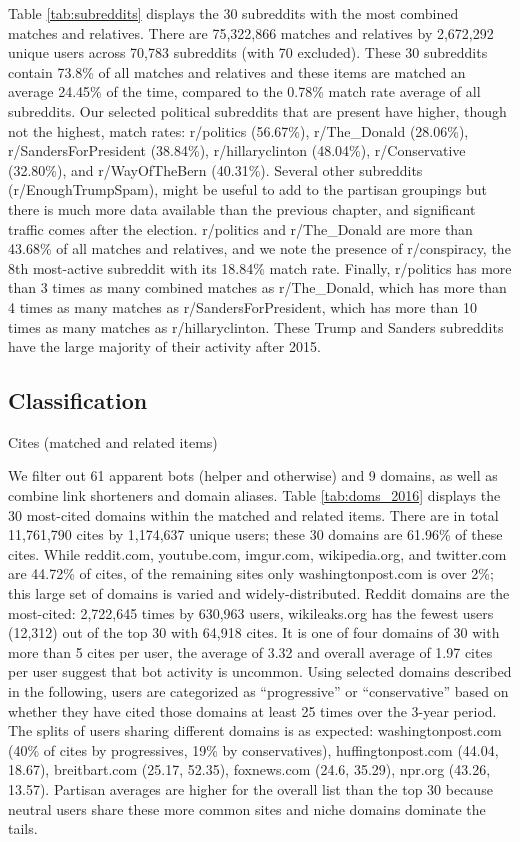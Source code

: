\documentclass[doublespacing]{utdthesis}
\begin{document}
Table \ref{tab:subreddits} displays the 30 subreddits with the most combined matches and relatives.
There are 75,322,866 matches and relatives by 2,672,292 unique users across 70,783 subreddits (with 70 excluded).
These 30 subreddits contain 73.8\% of all matches and relatives and these items are matched an average 24.45\% of the time, compared to the 0.78\% match rate average of all subreddits.
Our selected political subreddits that are present have higher, though not the highest, match rates: r/politics (56.67\%), r/The\_Donald (28.06\%), r/SandersForPresident (38.84\%), r/hillaryclinton (48.04\%), r/Conservative (32.80\%), and r/WayOfTheBern (40.31\%).
Several other subreddits (r/EnoughTrumpSpam), might be useful to add to the partisan groupings but there is much more data available than the previous chapter, and significant traffic comes after the election.
r/politics and r/The\_Donald are more than 43.68\% of all matches and relatives, and we note the presence of r/conspiracy, the 8th most-active subreddit with its 18.84\% match rate. 
Finally, r/politics has more than 3 times as many combined matches as r/The\_Donald, which has more than 4 times as many matches as r/SandersForPresident, which has more than 10 times as many matches as r/hillaryclinton.
These Trump and Sanders subreddits have the large majority of their activity after 2015.

\subsection{Classification}

\begin{table}[!ht]
\centering
\caption{Cites (matched and related items)}

\label{tab:doms_2016}
\end{table}

We filter out 61 apparent bots (helper and otherwise) and 9 domains, as well as combine link shorteners and domain aliases.
Table \ref{tab:doms_2016} displays the 30 most-cited domains within the matched and related items.
There are in total 11,761,790 cites by 1,174,637 unique users; these 30 domains are 61.96\% of these cites.
While reddit.com, youtube.com, imgur.com, wikipedia.org, and twitter.com are 44.72\% of cites, of the remaining sites only washingtonpost.com is over 2\%; this large set of domains is varied and widely-distributed.
Reddit domains are the most-cited: 2,722,645 times by 630,963 users, wikileaks.org has the fewest users (12,312) out of the top 30 with 64,918 cites.
It is one of four domains of 30 with more than 5 cites per user, the average of 3.32 and overall average of 1.97 cites per user suggest that bot activity is uncommon.
Using selected domains described in the following, users are categorized as ``progressive'' or ``conservative'' based on whether they have cited those domains at least 25 times over the 3-year period.
The splits of users sharing different domains is as expected: washingtonpost.com (40\% of cites by progressives, 19\% by conservatives), huffingtonpost.com (44.04, 18.67), breitbart.com (25.17, 52.35), foxnews.com (24.6, 35.29), npr.org (43.26, 13.57).
Partisan averages are higher for the overall list than the top 30 because neutral users share these more common sites and niche domains dominate the tails.
\end{document}
